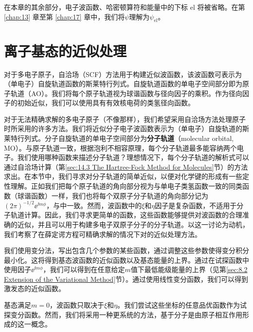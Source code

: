     在本章的其余部分，电子波函数、哈密顿算符和能量中的下标 el 将被省略。在第 \ref{chap:13} 章至第 \ref{chap:17} 章中，我们将$\psi$理解为$\psi_{\text{el}}$。

\section{离子基态的近似处理}
\label{sec:13.5 Approximate Treatments of the H2 Ground Electronic State}

    对于多电子原子，自洽场（SCF）方法用于构建近似波函数，该波函数可表示为（单电子）自旋轨道函数的斯莱特行列式。自旋轨道函数的单电子空间部分即为原子轨道（AO）。我们将每个原子轨道视为球谐函数与径向因子的乘积。作为径向因子的初始近似，我们可以使用具有有效核电荷的类氢径向函数。

    对于无法精确求解的多电子原子（不像那样），我们希望采用自洽场方法处理原子时所采用的许多方法。我们将近似分子电子波函数表示为（单电子）自旋轨道的斯莱特行列式。分子自旋轨道的单电子空间部分为\textbf{分子轨道}（molecular orbital, MO）。与原子轨道一致，根据泡利不相容原理，每个分子轨道最多能容纳两个电子。我们使用哪种函数来描述分子轨道？理想情况下，每个分子轨道的解析式可以通过自洽场计算（第\ref{sec:14.3 The Hartree-Fock Method for Molecules}节）的方法求出。在本节中，我们寻求对分子轨道的简单近似，以便对化学键的形成有一些定性理解。正如我们把每个原子轨道的角向部分视为与单电子类氢函数一致的同类函数（球谐函数）一样，我们也将每个双原子分子轨道的角向部分记为$\left(2\pi\right)^{-1/2}\ee ^{\ii m\phi}$，与中一致。然而，波函数中的$\xi$和$\eta$因子是复杂函数，不适用于分子轨道计算。因此，我们寻求更简单的函数，这些函数能够提供对波函数的合理准确的近似，并且可以用于构建多电子双原子分子的分子轨道。以这一讨论为动机，我们考察了在薛定谔方程可精确求解的情况下对的近似处理方法。

    我们使用变分法，写出包含几个参数的某些函数，通过调整这些参数使得变分积分最小化。这将得到基态波函数的近似函数以及基态能量的上界。通过在试探函数中使用因子$\ee ^{\ii m\phi}$，我们可以得到在任意给定$m$值下最低能级能量的上界（见第\ref{sec:8.2 Extension of the Variational Method}节）。通过使用线性变分函数，我们可以得到激发态的近似函数。

    基态满足$m=0$，波函数只取决于$\xi$和$\eta$。我们尝试这些坐标的任意品优函数作为试探变分函数。然而，我们将采用一种更系统的方法，基于分子是由原子相互作用形成的这一概念。

